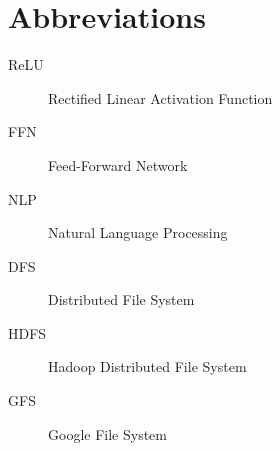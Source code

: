 \documentclass[\main/main.tex]{subfiles}
\begin{document}
\chapter*{Abbreviations}

\begin{description}
    \item[ReLU] Rectified Linear Activation Function
    \item[FFN] Feed-Forward Network
    \item[NLP] Natural Language Processing
    \item[DFS] Distributed File System
    \item[HDFS] Hadoop Distributed File System
    \item[GFS] Google File System
\end{description}
\end{document}
